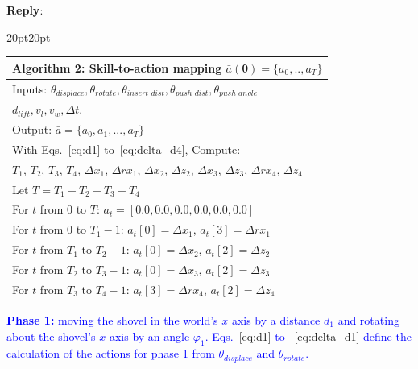\documentclass[11pt]{article}
\newenvironment{reply}
   {\medskip \noindent \begin{sf}\textbf{Reply}: \  }
   {\medskip \end{sf}}
\newcommand{\xt}[1]{\textcolor{blue}{#1}}
\begin{document}
\begin{reply}
\begin{adjustwidth}{20pt}{20pt}
\begin{table}[h]
\small
\centering
\begin{tabular}{>{\color{blue}}l}
\toprule
\textbf{Algorithm 2}: Skill-to-action mapping $\bar{a}(\pmb{\theta})=\{a_0,..,a_T\}$\\
\midrule
Inputs: $\theta_{ displace},\theta_{ rotate},\theta_{ insert\_dist},\theta_{ push\_dist},\theta_{ push\_angle}$\\
$d_{ lift}, v_l,v_w,\Delta t$. \\
Output: $\bar{a}=\{a_0,a_1,...,a_T\}$\\
\midrule
With Eqs.~\ref{eq:d1} to~\ref{eq:delta_d4}, Compute: \\
$T_1$, $T_2$, $T_3$, $T_4$, $\Delta x_1$, $\Delta rx_1$, $\Delta x_2$, $\Delta z_2$, $\Delta x_3$, $\Delta z_3$, $\Delta rx_4$, $\Delta z_4$\\
Let $T =T_1+T_2+T_3+T_4$\\
For $t$ from $0$ to $T$: \hspace{0.73cm} $a_t = [0.0, 0.0, 0.0, 0.0, 0.0, 0.0]$\\
For $t$ from $0$ to $T_1-1$: \hspace{0.07cm} $a_t[0] = \Delta x_1$, $a_t[3]=\Delta rx_1$\\
For $t$ from $T_1$ to $T_2-1$: $a_t[0] = \Delta x_2$, $a_t[2]=\Delta z_2$\\
For $t$ from $T_2$ to $T_3-1$: $a_t[0] = \Delta x_3$, $a_t[2]=\Delta z_3$\\
For $t$ from $T_3$ to $T_4-1$: $a_t[3] = \Delta rx_4$, $a_t[2]=\Delta z_4$\\
\bottomrule
\end{tabular}
\end{table}

\xt{\textbf{Phase 1:} moving the shovel in the world's $x$ axis by a distance $d_1$ and rotating about the shovel's $x$ axis by an angle $\varphi_1$. Eqs.~\ref{eq:d1} to ~\ref{eq:delta_d1} define the calculation of the actions for phase 1 from $\theta_{displace}$ and $\theta_{rotate}$.}


\end{adjustwidth}
\end{reply}
\end{document}
